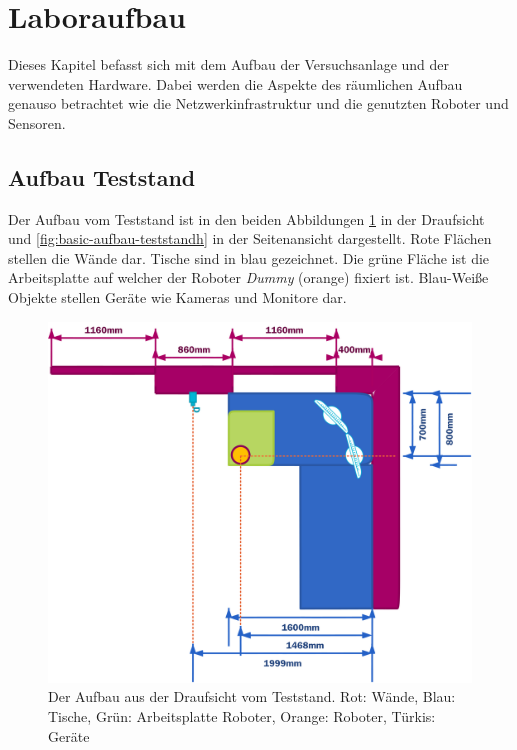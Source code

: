 \section{Laboraufbau}
\label{sec:basic-aufbau}
    
Dieses Kapitel befasst sich mit dem Aufbau der Versuchsanlage und der verwendeten Hardware. Dabei werden die Aspekte des räumlichen Aufbau genauso betrachtet wie die Netzwerkinfrastruktur und die genutzten Roboter und Sensoren.

\subsection{Aufbau Teststand}
Der Aufbau vom Teststand ist in den beiden Abbildungen \ref{fig:basic-aufbau-teststand} in der Draufsicht und \ref{fig:basic-aufbau-teststandh} in der Seitenansicht dargestellt. Rote Flächen stellen die Wände dar. Tische sind in blau gezeichnet. Die grüne Fläche ist die Arbeitsplatte auf welcher der Roboter \textit{Dummy} (orange) fixiert ist. Blau-Weiße Objekte stellen Geräte wie Kameras und Monitore dar.

 \begin{figure}[H]
 	\centering
 	\includegraphics[scale=0.7]{fig/ZeichnungRaum}   
 	\caption[Aufbau Teststand: Draufsicht]{Der Aufbau aus der Draufsicht vom Teststand. Rot: Wände, Blau: Tische, Grün: Arbeitsplatte Roboter, Orange: Roboter, Türkis: Geräte}
 	\label{fig:basic-aufbau-teststand}
 \end{figure}
 
